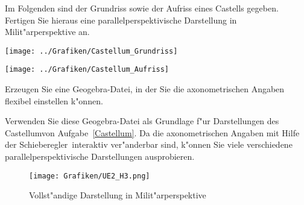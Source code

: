\small
\begin{Aufgabe}
Im Folgenden sind der Grundriss sowie der Aufriss eines Castells gegeben. Fertigen Sie hieraus eine parallelperspektivische Darstellung in Milit"arperspektive an.

\texttt{[image: ../Grafiken/Castellum\_Grundriss]}

\texttt{[image: ../Grafiken/Castellum\_Aufriss]}
\end{Aufgabe}
\begin{Aufgabe}
\begin{Teilaufgaben}
\item Erzeugen Sie eine Geogebra-Datei, in der Sie die axonometrischen Angaben flexibel einstellen k"onnen.
\item Verwenden Sie diese Geogebra-Datei als Grundlage f"ur Darstellungen des \glqq Castellum\grqq von Aufgabe~\ref{Castellum}. Da die axonometrischen Angaben mit Hilfe der \glqq Schieberegler\grqq\ interaktiv ver"anderbar sind, k"onnen Sie viele verschiedene parallelperspektivische Darstellungen ausprobieren.
\end{Teilaufgaben}
\end{Aufgabe}
\begin{Loesung}
	\begin{figure}[H]
		\centering
		\texttt{[image: Grafiken/UE2\_H3.png]}
		\caption{Vollst"andige Darstellung in Milit"arperspektive}
		\label{fig.H3}
	\end{figure}
\end{Loesung}

